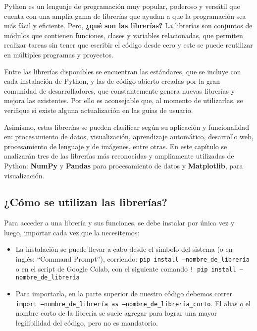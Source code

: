 \documentclass[
  letterpaper,
  DIV=11,
  numbers=noendperiod]{scrreprt}
\begin{document}
Python es un lenguaje de programación muy popular, poderoso y versátil
que cuenta con una amplia gama de librerías que ayudan a que la
programación sea más fácil y eficiente. Pero, \textbf{¿qué son las
librerías?} La librerías son conjuntos de módulos que contienen
funciones, clases y variables relacionadas, que permiten realizar tareas
sin tener que escribir el código desde cero y este se puede reutilizar
en múltiples programas y proyectos.

Entre las librerías disponibles se encuentran las estándares, que se
incluye con cada instalación de Python, y las de código abierto creadas
por la gran comunidad de desarrolladores, que constantemente genera
nuevas librerías y mejora las existentes. Por ello es aconsejable que,
al momento de utilizarlas, se verifique si existe alguna actualización
en las guías de usuario.

Asimismo, estas librerías se pueden clasificar según su aplicación y
funcionalidad en: procesamiento de datos, visualización, aprendizaje
automático, desarrollo web, procesamiento de lenguaje y de imágenes,
entre otras. En este capítulo se analizarán tres de las librerías más
reconocidas y ampliamente utilizadas de Python: \textbf{NumPy} y
\textbf{Pandas} para procesamiento de datos y \textbf{Matplotlib}, para
visualización.

\subsection{¿Cómo se utilizan las
librerías?}\label{cuxf3mo-se-utilizan-las-libreruxedas}

Para acceder a una librería y sus funciones, se debe instalar por única
vez y luego, importar cada vez que la necesitemos:

\begin{itemize}
\item
  La instalación se puede llevar a cabo desde el símbolo del sistema (o
  en inglés: ``Command Prompt''), corriendo:
  \texttt{pip\ install\ –nombre\_de\_librería} o en el script de Google
  Colab, con el siguiente comando
  \texttt{!\ pip\ install\ –nombre\_de\_librería}
\item
  Para importarla, en la parte superior de nuestro código debemos correr
  \texttt{import\ –nombre\_de\_librería\ as\ –nombre\_de\_librería\_corto}.
  El alias o el nombre corto de la librería se suele agregar para lograr
  una mayor legilibilidad del código, pero no es mandatorio.
\end{itemize}
\end{document}
